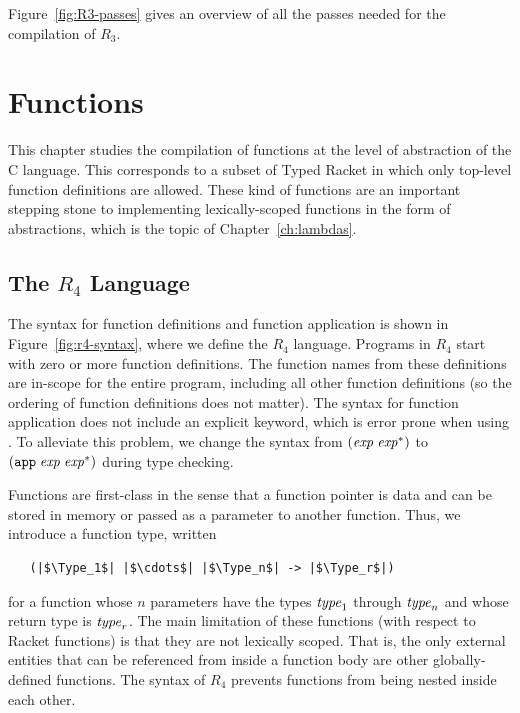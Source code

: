 \documentclass[11pt]{book}
\begin{document}
Figure~\ref{fig:R3-passes} gives an overview of all the passes needed
for the compilation of $R_3$.


\chapter{Functions}
\label{ch:functions}

This chapter studies the compilation of functions at the level of
abstraction of the C language. This corresponds to a subset of Typed
Racket in which only top-level function definitions are allowed. These
kind of functions are an important stepping stone to implementing
lexically-scoped functions in the form of  abstractions,
which is the topic of Chapter~\ref{ch:lambdas}.

\section{The $R_4$ Language}

The syntax for function definitions and function application is shown
in Figure~\ref{fig:r4-syntax}, where we define the $R_4$ language.
Programs in $R_4$ start with zero or more function definitions.  The
function names from these definitions are in-scope for the entire
program, including all other function definitions (so the ordering of
function definitions does not matter). The syntax for function
application does not include an explicit keyword, which is error prone
when using . To alleviate this problem, we change the
syntax from $(\mathit{exp} \; \mathit{exp}^{*})$ to $(\texttt{app}\; \mathit{exp} \; \mathit{exp}^{*})$
during type checking.

Functions are first-class in the sense that a function pointer is data
and can be stored in memory or passed as a parameter to another
function.  Thus, we introduce a function type, written
\begin{lstlisting}
   (|$\Type_1$| |$\cdots$| |$\Type_n$| -> |$\Type_r$|)
\end{lstlisting}
for a function whose $n$ parameters have the types $\mathit{type}_1$ through
$\mathit{type}_n$ and whose return type is $\mathit{type}_r$. The main limitation of
these functions (with respect to Racket functions) is that they are
not lexically scoped. That is, the only external entities that can be
referenced from inside a function body are other globally-defined
functions. The syntax of $R_4$ prevents functions from being nested
inside each other.
\end{document}
